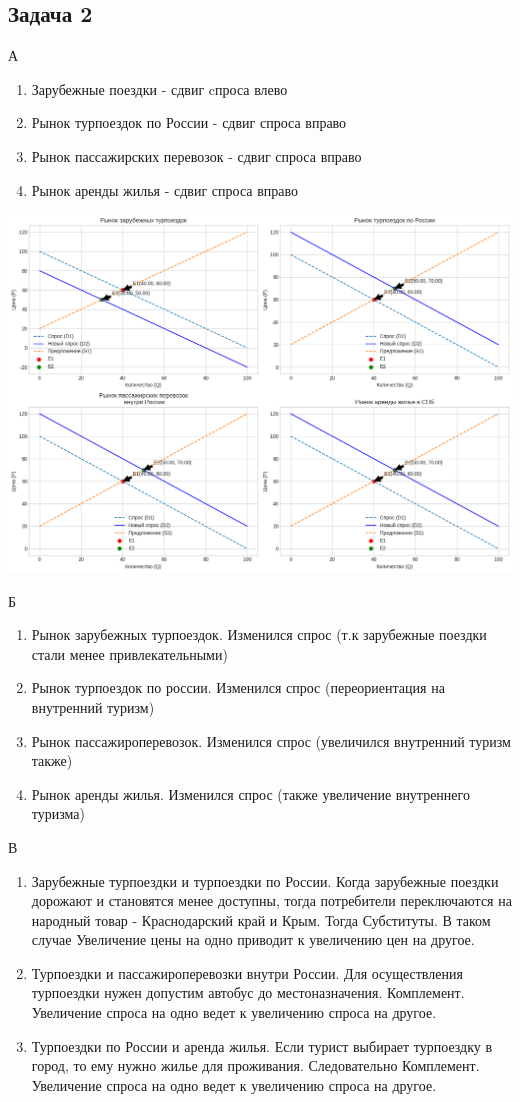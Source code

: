 \documentclass[a4paper,12pt]{article}
\begin{document}
\subsection{Задача 2}
А
\begin{enumerate}
    \item Зарубежные поездки - сдвиг cпроса влево 
    \item Рынок турпоездок по России - сдвиг спроса вправо 
    \item Рынок пассажирских перевозок - сдвиг спроса вправо 
    \item Рынок аренды жилья - сдвиг спроса вправо 
\end{enumerate}
\includegraphics[scale=0.45]{graphs/2.1.png}

Б
\begin{enumerate}
    \item Рынок зарубежных турпоездок. Изменился спрос (т.к зарубежные поездки стали менее привлекательными)
    \item Рынок турпоездок по россии. Изменился спрос (переориентация на внутренний туризм)
    \item Рынок пассажироперевозок. Изменился спрос (увеличился внутренний туризм также)
    \item Рынок аренды жилья. Изменился спрос (также увеличение внутреннего туризма)
\end{enumerate}

В
\begin{enumerate}
    \item Зарубежные турпоездки и турпоездки по России. Когда зарубежные поездки дорожают и становятся менее доступны, тогда потребители переключаются на народный товар - Краснодарский край и Крым. Тогда Субституты. В таком случае Увеличение цены на одно приводит к увеличению цен на другое.
    \item Турпоездки и пассажироперевозки внутри России. Для осуществления турпоездки нужен допустим автобус до местоназначения. Комплемент. Увеличение спроса на одно ведет к увеличению спроса на другое. 
    \item Турпоездки по России и аренда жилья. Если турист выбирает турпоездку в город, то ему нужно жилье для проживания. Следовательно Комплемент. Увеличение спроса на одно ведет к увеличению спроса на другое.
\end{enumerate}
\end{document}
